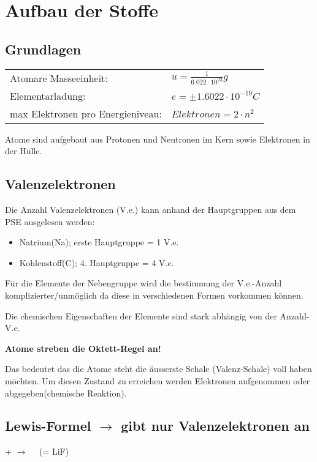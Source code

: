 \section{Aufbau der Stoffe}

\subsection{Grundlagen}
\begin{tabular}{ll}
    Atomare Masseeinheit:&$u = \frac{1}{6.022\cdot10^{23}}g$\\
    Elementarladung:&$e = \pm 1.6022 \cdot 10^{-19}C$\\
    max Elektronen pro Energieniveau:&$Elektronen = 2 \cdot n^{2}$
\end{tabular}

Atome sind aufgebaut aus Protonen und Neutronen im Kern sowie Elektronen in der Hülle.

\subsection{Valenzelektronen}
Die Anzahl Valenzelektronen (V.e.) kann anhand der Hauptgruppen aus dem PSE ausgelesen werden:
\begin{itemize}
    \item Natrium(Na); erste Hauptgruppe = 1 V.e.
    \item Kohlenstoff(C); 4. Hauptgruppe = 4 V.e.
\end{itemize}  
Für die Elemente der Nebengruppe wird die bestimmung der V.e.-Anzahl komplizierter/unmöglich da diese in verschiedenen Formen vorkommen können.

Die chemischen Eigenschaften der Elemente sind stark abhängig von der Anzahl-V.e. 

\textbf{Atome streben die Oktett-Regel an!}

Das bedeutet das die Atome steht die äusserste Schale (Valenz-Schale) voll haben möchten. 
Um diesen Zustand zu erreichen werden Elektronen aufgenommen oder abgegeben(chemische Reaktion).

\subsection{Lewis-Formel $\rightarrow$ gibt nur Valenzelektronen an}
\begin{center}
     +
    $\longrightarrow$
    $\quad$(= LiF)
\end{center}
\vspace{-0.6cm}
